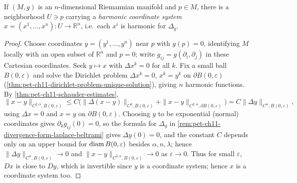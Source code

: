 \begin{lemma}
  \label{lem:pet-ch11-harmonic-coordinates-exist}
  If $(M,g)$ is an $n$-dimensional Riemannian manifold and $p\in M$, there is
  a neighborhood $U\ni p$ carrying a \emph{harmonic coordinate system}
  $x=(x^1,\dots,x^n):U\to\mathbb{R}^n$, i.e.\ each $x^i$ is harmonic for
  $\Delta_g$.
\end{lemma}
\begin{proof}
  Choose coordinates $y=(y^1,\dots,y^n)$ near $p$ with $y(p)=0$, identifying
  $M$ locally with an open subset of $\mathbb{R}^n$ and $p=0$; write
  $g_{ij}=g(\partial_i,\partial_j)$ in these Cartesian coordinates. Seek
  $y\mapsto x$ with $\Delta x^k=0$ for all $k$. Fix a small ball
  $B(0,\varepsilon)$ and solve the Dirichlet problem $\Delta x^k=0$,
  $x^k=y^k$ on $\partial B(0,\varepsilon)$
  (\cref{thm:pet-ch11-dirichlet-problem-unique-solution}), giving $n$
  harmonic functions. By \cref{thm:pet-ch11-schauder-estimates},
  \[
    \|x-y\|_{C^{2,\alpha},B(0,\varepsilon)}
    \le C\big(\|\Delta(x-y)\|_{C^0,B(0,\varepsilon)}+\|x-y\|_{C^{2,\alpha},\partial B(0,\varepsilon)}\big)
    =C\|\Delta y\|_{C^\alpha,B(0,\varepsilon)},
  \]
  using $\Delta x=0$ and $x=y$ on $\partial B(0,\varepsilon)$. Choosing $y$ to
  be exponential (normal) coordinates gives $\partial_kg_{ij}(0)=0$, so the
  formula for $\Delta_g$ in \cref{rem:pet-ch11-divergence-form-laplace-beltrami}
  gives $\Delta y(0)=0$, and the constant $C$ depends only on an upper bound
  for $\operatorname{diam} B(0,\varepsilon)$ besides $\alpha,n,\lambda$; hence
  $\|\Delta y\|_{C^\alpha,B(0,\varepsilon)}\to0$ and
  $\|x-y\|_{C^{2,\alpha},B(0,\varepsilon)}\to0$ as $\varepsilon\to0$. Thus for
  small $\varepsilon$, $Dx$ is close to $Dy$, which is invertible since $y$ is
  a coordinate system; hence $x$ is a coordinate system too.
\end{proof}

